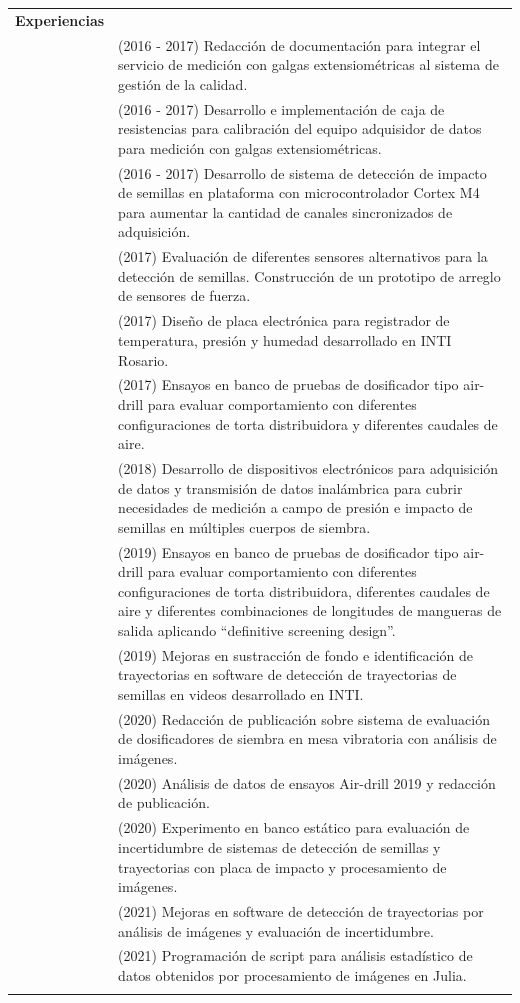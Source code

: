 \documentclass[a4paper,10pt, sans]{article}
\begin{document}
\begin{table}[H]
\begin{tabularx}{\textwidth}{r X}  
 \textbf{Experiencias} & {} \\ [1ex]
        {} & (2016 - 2017) Redacción de documentación para integrar el servicio de medición con galgas extensiométricas al sistema de gestión de la calidad. \\
        {} & (2016 - 2017) Desarrollo e implementación de caja de resistencias para calibración del equipo adquisidor de datos para medición con galgas extensiométricas. \\
        {} & (2016 - 2017) Desarrollo de sistema de detección de impacto de semillas en plataforma con microcontrolador Cortex M4 para aumentar la cantidad de canales sincronizados de adquisición. \\
        {} & (2017) Evaluación de diferentes sensores alternativos para la detección de semillas. Construcción de un prototipo de arreglo de sensores de fuerza. \\
        {} & (2017) Diseño de placa electrónica para registrador de temperatura, presión y humedad desarrollado en INTI Rosario. \\
        {} & (2017) Ensayos en banco de pruebas de dosificador tipo air-drill para evaluar comportamiento con diferentes configuraciones de torta distribuidora y diferentes caudales de aire. \\
        {} & (2018) Desarrollo de dispositivos electrónicos para adquisición de datos y transmisión de datos inalámbrica para cubrir necesidades de medición a campo de presión e impacto de semillas en múltiples cuerpos de siembra. \\
        {} & (2019) Ensayos en banco de pruebas de dosificador tipo air-drill para evaluar comportamiento con diferentes configuraciones de torta distribuidora, diferentes caudales de aire y diferentes combinaciones de longitudes de mangueras de salida aplicando ``definitive screening design''. \\
        {} & (2019) Mejoras en sustracción de fondo e identificación de trayectorias en software de detección de trayectorias de semillas en videos desarrollado en INTI. \\
        {} & (2020) Redacción de publicación sobre sistema de evaluación de dosificadores de siembra en mesa vibratoria con análisis de imágenes. \\
        {} & (2020) Análisis de datos de ensayos Air-drill 2019 y redacción de publicación. \\
        {} & (2020) Experimento en banco estático para evaluación de incertidumbre de sistemas de detección de semillas y trayectorias con placa de impacto y procesamiento de imágenes.\\
        {} & (2021) Mejoras en software de detección de trayectorias por análisis de imágenes y evaluación de incertidumbre. \\
        {} & (2021) Programación de script para análisis estadístico de datos obtenidos por procesamiento de imágenes en Julia. \\ \\


\end{tabularx}
\end{table}
\end{document}
